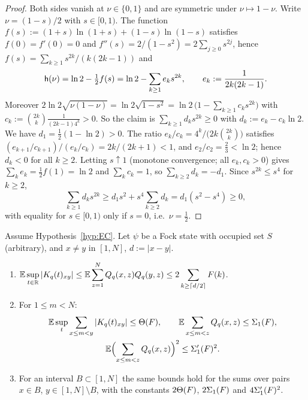 \begin{proof}
Both sides vanish at $\nu\in\{0,1\}$ and are symmetric under $\nu\mapsto1-\nu$.  Write $\nu=(1-s)/2$ with
$s\in[0,1)$.  The function $f(s):=(1+s)\ln(1+s)+(1-s)\ln(1-s)$ satisfies $f(0)=f'(0)=0$ and
$f''(s)=2/(1-s^2)=2\sum_{j\ge0}s^{2j}$, hence $f(s)=\sum_{k\ge1}s^{2k}/(k(2k-1))$ and
\[
  \mathsf{h}(\nu)=\ln2-\tfrac12f(s)=\ln2-\sum_{k\ge1}e_ks^{2k},\qquad e_k:=\frac1{2k(2k-1)} .
\]
Moreover $2\ln2\sqrt{\nu(1-\nu)}=\ln2\sqrt{1-s^2}=\ln2\,\bigl(1-\sum_{k\ge1}c_ks^{2k}\bigr)$ with
$c_k:=\binom{2k}{k}\frac1{(2k-1)4^k}>0$.  So the claim is $\sum_{k\ge1}d_ks^{2k}\ge0$ with
$d_k:=e_k-c_k\ln2$.  We have $d_1=\frac12(1-\ln2)>0$.  The ratio
$e_k/c_k=4^k/\bigl(2k\binom{2k}{k}\bigr)$ satisfies $(e_{k+1}/c_{k+1})/(e_k/c_k)=2k/(2k+1)<1$, and
$e_2/c_2=\frac23<\ln2$; hence $d_k<0$ for all $k\ge2$.  Letting $s\uparrow1$ (monotone convergence; all
$e_k,c_k>0$) gives $\sum_ke_k=\frac12f(1)=\ln2$ and $\sum_kc_k=1$, so $\sum_{k\ge2}d_k=-d_1$.  Since
$s^{2k}\le s^4$ for $k\ge2$,
\[
  \sum_{k\ge1}d_ks^{2k}\ge d_1s^2+s^4\sum_{k\ge2}d_k=d_1(s^2-s^4)\ge0,
\]
with equality for $s\in[0,1)$ only if $s=0$, i.e.\ $\nu=\frac12$.
\end{proof}

\begin{lemma}\label{lem:annealed}
Assume Hypothesis~\ref{hyp:EC}.  Let $\psi$ be a Fock state with occupied set $S$ (arbitrary), and
$x\neq y$ in $[1,N]$, $d:=|x-y|$.
\begin{enumerate}[label=(\roman*)]
\item $\displaystyle\mathbb{E}\sup_{t\in\mathbb{R}}|K_q(t)_{xy}|\le\mathbb{E}\sum_{z=1}^NQ_q(x,z)Q_q(y,z)\le2\sum_{k\ge\lceil d/2\rceil}F(k)$.
\item For $1\le m<N$:
\begin{gather*}
  \mathbb{E}\sup_t\sum_{x\le m<y}|K_q(t)_{xy}|\le\Theta(F),\qquad
  \mathbb{E}\sum_{x\le m<z}Q_q(x,z)\le\Sigma_1(F),\\
  \mathbb{E}\Bigl(\sum_{x\le m<z}Q_q(x,z)\Bigr)^2\le\Sigma_1'(F)^2 .
\end{gather*}
\item For an interval $B\subset[1,N]$ the same bounds hold for the sums over pairs $x\in B$,
$y\in[1,N]\setminus B$, with the constants $2\Theta(F)$, $2\Sigma_1(F)$ and $4\Sigma_1'(F)^2$.
\end{enumerate}
\end{lemma}

